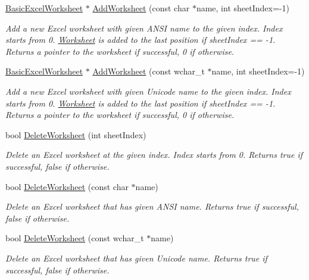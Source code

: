 \begin{DoxyCompactItemize}
\hyperlink{class_y_excel_1_1_basic_excel_worksheet}{Basic\+Excel\+Worksheet} $\ast$ \hyperlink{class_y_excel_1_1_basic_excel_a1bc4925fe7d1885962897531f6163b17}{Add\+Worksheet} (const char $\ast$name, int sheet\+Index=-\/1)
\begin{DoxyCompactList}\small\item\em Add a new Excel worksheet with given A\+N\+S\+I name to the given index. Index starts from 0. \hyperlink{class_y_excel_1_1_worksheet}{Worksheet} is added to the last position if sheet\+Index == -\/1. Returns a pointer to the worksheet if successful, 0 if otherwise. \end{DoxyCompactList}\item 
\hyperlink{class_y_excel_1_1_basic_excel_worksheet}{Basic\+Excel\+Worksheet} $\ast$ \hyperlink{class_y_excel_1_1_basic_excel_a512154ae5f11bdf8440a37c664eb5b76}{Add\+Worksheet} (const wchar\+\_\+t $\ast$name, int sheet\+Index=-\/1)
\begin{DoxyCompactList}\small\item\em Add a new Excel worksheet with given Unicode name to the given index. Index starts from 0. \hyperlink{class_y_excel_1_1_worksheet}{Worksheet} is added to the last position if sheet\+Index == -\/1. Returns a pointer to the worksheet if successful, 0 if otherwise. \end{DoxyCompactList}\item 
bool \hyperlink{class_y_excel_1_1_basic_excel_af5113897cf4c4326e1ad14e38f745ec1}{Delete\+Worksheet} (int sheet\+Index)
\begin{DoxyCompactList}\small\item\em Delete an Excel worksheet at the given index. Index starts from 0. Returns true if successful, false if otherwise. \end{DoxyCompactList}\item 
bool \hyperlink{class_y_excel_1_1_basic_excel_aada082cff09c5c7953a50fa0baef401a}{Delete\+Worksheet} (const char $\ast$name)
\begin{DoxyCompactList}\small\item\em Delete an Excel worksheet that has given A\+N\+S\+I name. Returns true if successful, false if otherwise. \end{DoxyCompactList}\item 
bool \hyperlink{class_y_excel_1_1_basic_excel_a1b9a7b19867acdece16040a2b1002120}{Delete\+Worksheet} (const wchar\+\_\+t $\ast$name)
\begin{DoxyCompactList}\small\item\em Delete an Excel worksheet that has given Unicode name. Returns true if successful, false if otherwise. \end{DoxyCompactList}\item 

\end{DoxyCompactItemize}

